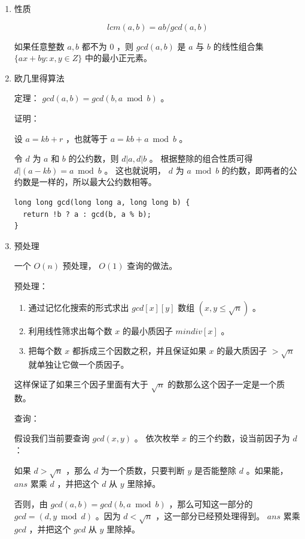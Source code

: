 \documentclass[11pt]{article}
\begin{document}
\begin{enumerate}
\item 性质
\label{sec-3-3-1-1}

$$lcm(a,b) = ab/gcd(a,b)$$

如果任意整数 $a,b$ 都不为 $0$  ，则 $gcd(a,b)$ 是 $a$ 与 $b$ 的线性组合集 $\{ax+by:x,y \in Z\}$ 中的最小正元素。

\item 欧几里得算法
\label{sec-3-3-1-2}

定理： $gcd(a, b) = gcd(b, a \bmod b)$ 。

证明：

设 $a = kb + r$  ，也就等于 $a = kb + a \bmod b$  。

令 $d$ 为 $a$ 和 $b$ 的公约数，则 $d|a,d|b$ 。 根据整除的组合性质可得 $d|(a-kb)=a \bmod b$  。
这也就说明， $d$ 为 $a \bmod b$ 的约数，即两者的公约数是一样的，所以最大公约数相等。

\begin{verbatim}
long long gcd(long long a, long long b) {
  return !b ? a : gcd(b, a % b);
}
\end{verbatim}

\item 预处理
\label{sec-3-3-1-3}

一个 $O(n)$ 预处理， $O(1)$ 查询的做法。

预处理：

\begin{enumerate}
\item 通过记忆化搜索的形式求出 $gcd[x][y]$ 数组 $(x,y \leq\sqrt{n})$ 。

\item 利用线性筛求出每个数 $x$ 的最小质因子 $mindiv[x]$ 。

\item 把每个数 $x$ 都拆成三个因数之积，并且保证如果 $x$ 的最大质因子 $> \sqrt{n}$ 就单独让它做一个质因子。
\end{enumerate}

这样保证了如果三个因子里面有大于 $\sqrt{n}$ 的数那么这个因子一定是一个质数。

查询：

假设我们当前要查询 $gcd(x,y)$ 。 依次枚举 $x$ 的三个约数，设当前因子为 $d$  ：

如果 $d>\sqrt{n}$ ，那么 $d$ 为一个质数，只要判断 $y$ 是否能整除 $d$ 。如果能， $ans$ 累乘 $d$ ，并把这个 $d$ 从 $y$ 里除掉。

否则，由 $gcd(a,b)=gcd(b,a \bmod b)$ ，那么可知这一部分的 $gcd=(d,y \bmod d)$ 。因为 $d<\sqrt{n}$ ，这一部分已经预处理得到。 $ans$ 累乘 $gcd$ ，并把这个 $gcd$ 从 $y$ 里除掉。


\end{enumerate}
\end{document}
